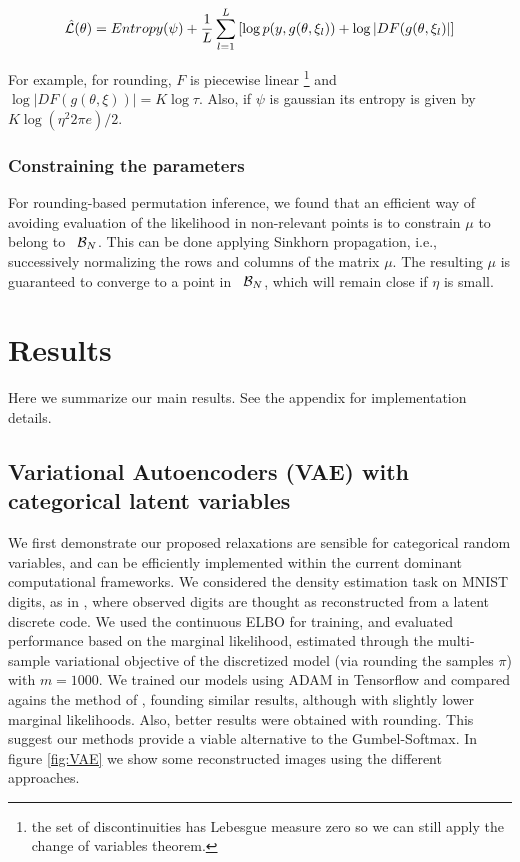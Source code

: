 \documentclass{article}
\begin{document}
$$\hat{\mathcal{L}}(\theta) = Entropy(\psi) +  \frac{1}{L}\sum_{l=1}^L \left[ \log p(y,  g(\theta, \xi_l) ) +  \log |DF(g(\theta, \xi_l)|\right] $$

For example, for rounding, $F$ is piecewise linear \footnote{the set of discontinuities has Lebesgue measure zero so we can still apply the change of variables theorem.} and $\log | DF(g(\theta, \xi)) |= K\log \tau$. Also, if $\psi$ is gaussian its entropy is given by $K\log(\eta^2 2\pi e  )/2$.


\subsubsection{Constraining the parameters}
For rounding-based permutation inference, we found that an efficient way of avoiding evaluation of the likelihood in non-relevant points is to constrain $\mu$ to belong to ~$\mathcal{B}_N$. This can be done applying Sinkhorn propagation, i.e., successively normalizing the rows and columns of the matrix $\mu$. The resulting $\mu$ is guaranteed to converge to a point in ~$\mathcal{B}_N$, which will remain close if $\eta$ is small.
\section{Results}
Here we summarize our main results. See the appendix for implementation details.
\subsection{Variational Autoencoders (VAE) with categorical latent variables}
We first demonstrate our proposed relaxations are sensible for categorical random variables, and can be efficiently implemented within the current dominant computational frameworks. We considered the density estimation task on MNIST digits, as in \cite{maddison2016concrete, jang2016categorical}, where observed digits are thought as reconstructed from a latent discrete code. We used the continuous ELBO for training, and evaluated performance based on the marginal likelihood, estimated through the multi-sample variational objective of the discretized model (via rounding the samples $\pi$) with $m=1000$. We trained our models using ADAM in Tensorflow and compared agains the method of \cite{jang2016categorical}, founding similar results, although with slightly lower marginal likelihoods. Also, better results were obtained with rounding. This suggest our methods provide a viable alternative to the Gumbel-Softmax. In figure \ref{fig:VAE} we show some reconstructed images using the different approaches.
\end{document}
